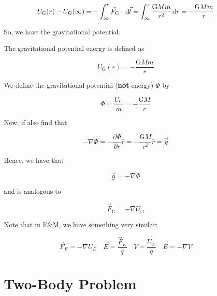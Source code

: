 \begin{equation}
	U_\mathrm{G}(r) - U_\mathrm{G}(\infty) = - \int_\infty^r \vec F_\mathrm{G} \cdot \D \vec l = \int_\infty^r \frac{\mathrm{G} M m}{r^2} \D r = - \frac{\mathrm{G} M m}{r}
\end{equation}

So, we have the gravitational potential.

\begin{definition}
	The gravitational potential energy is defined as
	
	\begin{equation}
		U_\mathrm{G}(r) = - \frac{\mathrm{G} M m}{r} 
	\end{equation}
\end{definition}

We define the gravitational potential (\textbf{not} energy) $\Phi$ by

\begin{equation}
	\Phi = \frac{U_\mathrm{G}}{m} = -\frac{\mathrm{G}M}{r}
\end{equation}

Now, if also find that

\begin{equation}
	- \nabla \Phi = - \frac{\partial \Phi}{\partial r} \hat r = - \frac{\mathrm{G}M}{r^2} \hat r = \vec g
\end{equation}

Hence, we have that

\begin{equation}
	\vec g = - \nabla \Phi
\end{equation}

and is analogous to

\begin{equation}
	\vec F_\mathrm{G} = - \nabla U_\mathrm{G}
\end{equation}

\begin{remark}
	Note that in E\&M, we have something very similar:

	\begin{equation}
		\vec F_E = - \nabla U_E \quad \vec E = \frac{\vec F_E}{q} \quad V = \frac{U_E}{q} \quad \vec E = - \nabla V
	\end{equation}
\end{remark}

\section{Two-Body Problem}

